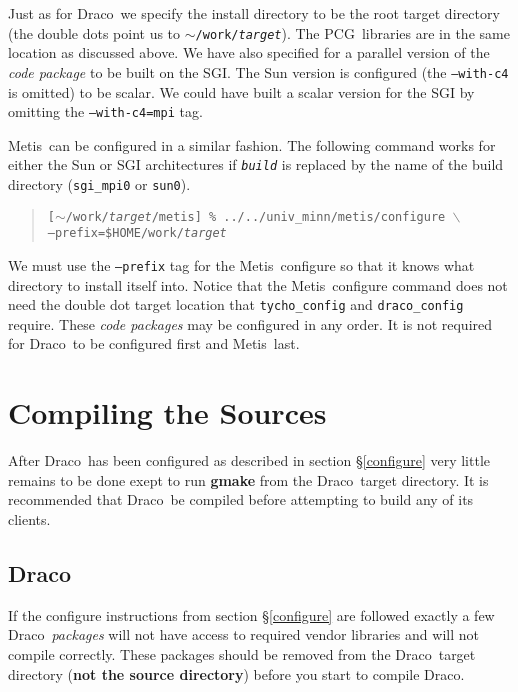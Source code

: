 \documentclass[10pt]{nmemo}
\newcommand{\comp}[1]{\normalfont\normalsize\texttt{#1}}
\newcommand{\draco}{{\normalfont\sffamily Draco}}
\newcommand{\metis}{{\normalfont\sffamily Metis}}
\newcommand{\pcg}{{\normalfont\sffamily PCG}}
\begin{document}
Just as for \draco\ we specify the install directory to be the root
target directory (the double dots point us to
\comp{$\sim$/work/\emph{target}}).  The \pcg\ libraries are in the
same location as discussed above.  We have also specified for a
parallel version of the \emph{code package} to be built on the SGI.
The Sun version is configured (the \comp{--with-c4} is omitted) to be
scalar.  We could have built a scalar version for the SGI by omitting
the \comp{--with-c4=mpi} tag.

\metis\ can be configured in a similar fashion.  The following command
works for either the Sun or SGI architectures if \comp{\emph{build}}
is replaced by the name of the build directory (\comp{sgi\_mpi0} or
\comp{sun0}).

\footnotesize
\begin{verse}
\texttt{[$\sim$/work/\emph{target}/metis] \%
../../univ\_minn/metis/configure $\backslash$\\
\hspace{0.5in}--prefix=\${HOME}/work/\emph{target}}
\end{verse}
\normalsize

We must use the \comp{--prefix} tag for the \metis\ configure so that
it knows what directory to install itself into.  Notice that the
\metis\ configure command does not need the double dot target location
that \comp{tycho\_config} and \comp{draco\_config} require.  These
\emph{code packages} may be configured in any order.  It is not
required for \draco\ to be configured first and \metis\ last.


\section{Compiling the Sources}
\label{compile}

After \draco\ has been configured as described in section
\S\ref{configure} very little remains to be done exept to run
\textbf{gmake} from the \draco\ target directory.  It is recommended
that \draco\ be compiled before attempting to build any of its
clients. 

\subsection{\draco}

If the configure instructions from section \S\ref{configure} are
followed exactly a few \draco\ \emph{packages} will not have access to
required vendor libraries and will not compile correctly.  These
packages should be removed from the \draco\ target directory
(\textbf{not the source directory}) before you start to compile
\draco.
\end{document}
